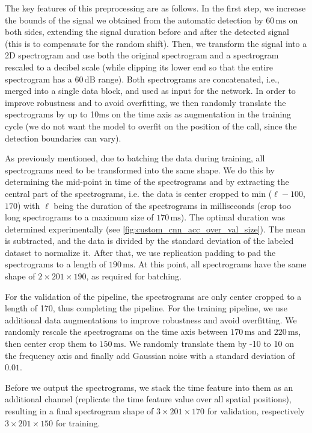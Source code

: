 \documentclass[preprint,NumberedRefs]{JASA}
\begin{document}
The key features of this preprocessing are as follows. In the first step, we increase the bounds of the signal we obtained from the automatic detection by \(60\,\mathrm{ms}\) on both sides, extending the signal duration before and after the detected signal (this is to compensate for the random shift).
%
Then, we transform the signal into a 2D spectrogram and use both the original spectrogram and a spectrogram rescaled to a decibel scale (while clipping its lower end so that the entire spectrogram has a \(60\,\mathrm{dB}\) range). Both spectrograms are concatenated, i.e., merged into a single data block, and used as input for the network.
%
In order to improve robustness and to avoid overfitting, we then randomly translate the spectrograms by up to 10ms on the time axis as augmentation in the training cycle (we do not want the model to overfit on the position of the call, since the detection boundaries can vary).

As previously mentioned, due to batching the data during training, all spectrograms need to be transformed into the same shape.
%
We do this by determining the mid-point in time of the spectrograms and by extracting the central part of the spectrograms, i.e. the data is center cropped to min ($\ell  -100$, $170$) with $\ell$ being the duration of the spectrograms in milliseconds (crop too long spectrograms to a maximum size of \(170\,\mathrm{ms}\)). The optimal duration was determined experimentally (see \autoref{fig:custom_cnn_acc_over_val_size}).
%
The mean is subtracted, and the data is divided by the standard deviation of the labeled dataset to normalize it.
%
After that, we use replication padding to pad the spectrograms to a length of \(190\,\mathrm{ms}\). At this point, all spectrograms have the same shape of \(2 \times 201 \times 190\), as required for batching.

For the validation of the pipeline, the spectrograms are only center cropped to a length of 170, thus completing the pipeline.
%
For the training pipeline, we use additional data augmentations to improve robustness and avoid overfitting. 
%
We randomly rescale the spectrograms on the time axis between \(170\,\mathrm{ms}\) and \(220\,\mathrm{ms}\), then center crop them to \(150\,\mathrm{ms}\). We randomly translate them by -10 to 10 on the frequency axis and finally add Gaussian noise with a standard deviation of \(0.01\).

Before we output the spectrograms, we stack the time feature into them as an additional channel (replicate the time feature value over all spatial positions), resulting in a final spectrogram shape of $3 \times 201 \times 170$ for validation, respectively $3 \times 201 \times 150$ for training.
\end{document}
